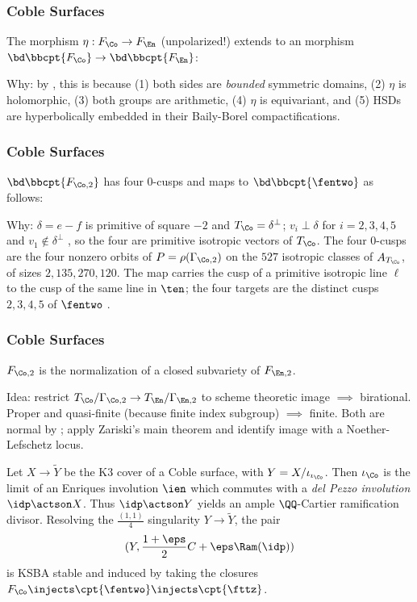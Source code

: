 \documentclass{beamer}
\begin{document}
{\begin{frame}
\end{frame}
\begin{frame}\frametitle{Coble Surfaces}
\begin{theorem}\label{thm:cusp_correspondence}
The morphism $\eta: F_\Co\to F_\En$ (unpolarized!) extends to an morphism $\bd \bbcpt{F_{\Co}} \to \bd \bbcpt{F_{\En}}$:


\end{theorem}
{\tiny
Why: by \cite{KK72}, this is because (1) both sides are \textit{bounded} symmetric domains, (2) $\eta$ is holomorphic, (3) both groups are arithmetic, (4) $\eta$ is equivariant, and (5) HSDs are hyperbolically embedded in their Baily-Borel compactifications.
}
\end{frame}
\begin{frame}\frametitle{Coble Surfaces}
{\small
\begin{theorem}
$\bd\bbcpt{F_{\Co, 2}}$ has four 0-cusps and maps to $\bd\bbcpt{\fentwo}$ as follows:
\end{theorem}
\tiny
Why: $\delta=e-f$ is primitive of square $-2$ and $T_{\Co}=\delta^{\perp}$; $v_i\perp\delta$ for $i=2,3,4,5$ and $v_1\not\in\delta^{\perp}$ \cite{Ste91}, so the four are primitive isotropic vectors of $T_{\Co}$. The four $0$-cusps are the four nonzero orbits of $P=\rho(\Gamma_{\Co,2})$ on the $527$ isotropic classes of $A_{T_{\Co}}$, of sizes $2,135,270,120$. The map carries the cusp of a primitive isotropic line $\ell$ to the cusp of the same line in $\ten$; the four targets are the distinct cusps $2,3,4,5$ of $\fentwo$ \cite{Ste91}.
}
\end{frame}
\begin{frame}\frametitle{Coble Surfaces}
\begin{theorem}
$F_{\Co, 2}$ is the normalization of a closed subvariety of $F_{\En, 2}$.
\end{theorem}
{\small
Idea: restrict $T_{\Co}/\Gamma_{\Co, 2} \to T_{\En}/\Gamma_{\En, 2}$ to scheme theoretic image $\implies$ birational. Proper and quasi-finite (because finite index subgroup) $\implies$ finite. Both are normal by \cite{BB66}; apply Zariski's main theorem and identify image with a Noether-Lefschetz locus.
}
\begin{conjecture}
{\small
Let $X\to \tilde Y$ be the K3 cover of a Coble surface, with $Y = X/\iota_{\iota_{\Co}}$. Then $\iota_{\Co}$ is the limit of an Enriques involution $\ien$ which commutes with a \textit{del Pezzo involution} $\idp\actson X$. Thus $\idp\actson Y$ yields an ample $\QQ$-Cartier ramification divisor. Resolving the $\frac{ (1,1)}{ 4}$ singularity $Y\to \tilde Y$, the pair \[ (Y, \frac{1 + \eps}{2} C + \eps \Ram(\idp)) \] 
is KSBA stable and induced by taking the closures $F_{\Co} \injects \cpt{\fentwo} \injects \cpt{\fttz}$.
}
\end{conjecture}
\end{frame}

}
\end{document}
